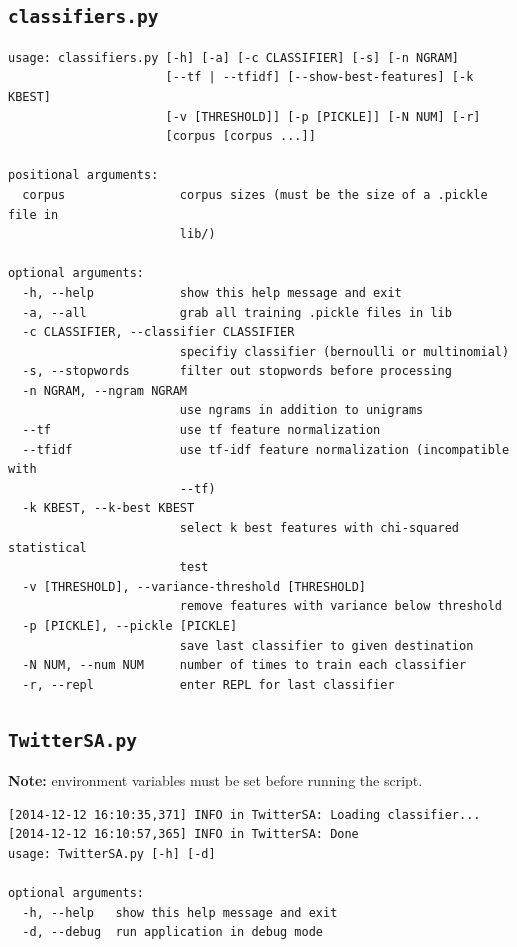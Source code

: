\documentclass[letter,12pt]{article}
\begin{document}
\subsection{\texttt{classifiers.py}}
\label{sub:classifiers}

\begingroup
\fontsize{10pt}{12pt}\selectfont
\begin{verbatim}
usage: classifiers.py [-h] [-a] [-c CLASSIFIER] [-s] [-n NGRAM]
                      [--tf | --tfidf] [--show-best-features] [-k KBEST]
                      [-v [THRESHOLD]] [-p [PICKLE]] [-N NUM] [-r]
                      [corpus [corpus ...]]

positional arguments:
  corpus                corpus sizes (must be the size of a .pickle file in
                        lib/)

optional arguments:
  -h, --help            show this help message and exit
  -a, --all             grab all training .pickle files in lib
  -c CLASSIFIER, --classifier CLASSIFIER
                        specifiy classifier (bernoulli or multinomial)
  -s, --stopwords       filter out stopwords before processing
  -n NGRAM, --ngram NGRAM
                        use ngrams in addition to unigrams
  --tf                  use tf feature normalization
  --tfidf               use tf-idf feature normalization (incompatible with
                        --tf)
  -k KBEST, --k-best KBEST
                        select k best features with chi-squared statistical
                        test
  -v [THRESHOLD], --variance-threshold [THRESHOLD]
                        remove features with variance below threshold
  -p [PICKLE], --pickle [PICKLE]
                        save last classifier to given destination
  -N NUM, --num NUM     number of times to train each classifier
  -r, --repl            enter REPL for last classifier
\end{verbatim}
\endgroup

\subsection{\texttt{TwitterSA.py}}
\label{sub:twittersa}

\textbf{Note:} environment variables must be set before running the script.

\begingroup
\fontsize{10pt}{12pt}\selectfont
\begin{verbatim}
[2014-12-12 16:10:35,371] INFO in TwitterSA: Loading classifier...
[2014-12-12 16:10:57,365] INFO in TwitterSA: Done
usage: TwitterSA.py [-h] [-d]

optional arguments:
  -h, --help   show this help message and exit
  -d, --debug  run application in debug mode
\end{verbatim}
\endgroup
\end{document}
